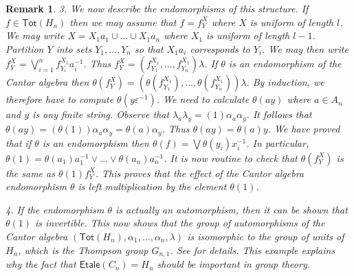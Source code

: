 \documentclass[a4paper]{amsart}
\newtheorem{remark}[theorem]{Remark}
\begin{document}
\begin{remark}
{3. {\em We now describe the endomorphisms of this structure.}
If $f \in \mathsf{Tot}(H_{n})$ then we may assume that $f = f^{X}_{Y}$
where $X$ is uniform of length $l$.
We may write
$X = X_{1}a_{1} \cup \ldots \cup X_{1}a_{n}$
where $X_{1}$ is uniform of length $l-1$.
Partition $Y$ into sets $Y_{1},\ldots, Y_{n}$
so that $X_{1}a_{i}$ corresponds to $Y_{i}$.
We may then write $f^{X}_{Y} = \bigvee_{i=1}^{n} f^{X_{1}}_{Y_{i}}a_{i}^{-1}$.
Thus $f^{X}_{Y} = (f^{X_{1}}_{Y_{1}}, \ldots, f^{X_{1}}_{Y_{n}})\lambda$.
If $\theta$ is an endomorphism of the Cantor algebra then
$\theta (f^{X}_{Y}) = (\theta (f^{X_{1}}_{Y_{1}}), \ldots, \theta (f^{X_{1}}_{Y_{n}}))\lambda$.
By induction, we therefore have to compute $\theta (y\varepsilon^{-1})$.
We need to calculate $\theta (ay)$ where $a \in A_{n}$ and $y$ is any finite string.
Observe that $\lambda_{a} \lambda_{y} = (1)\alpha_{a} \alpha_{y}$.
It follows that $\theta (ay) = (\theta (1))\alpha_{a}\alpha_{y} = \theta (a)\alpha_{y}$.
Thus $\theta (ay) = \theta (a)y$.
We have proved that if  $\theta$ is an endomorphism then $\theta (f) = \bigvee \theta (y_{i})x_{i}^{-1}$.
In particular, $\theta (1) = \theta (a_{1})a_{1}^{-1} \vee \ldots \vee \theta (a_{n})a_{n}^{-1}$.
It is now routine to check that $\theta (f^{X}_{Y})$ is the same as $\theta (1)f^{X}_{Y}$.
This proves that the effect of the Cantor algebra endomorphism  $\theta$ is left multiplication by the element $\theta (1)$.

4. {\em If the endomorphism $\theta$ is actually an automorphism, then it can be shown that $\theta (1)$ is invertible.}
This now shows that the group of automorphisms of the Cantor algebra $(\mathsf{Tot}(H_{n}), \alpha_{1}, \ldots, \alpha_{n}, \lambda)$
is isomorphic to the group of units of $H_{n}$, which is the Thompson group $G_{n,1}$.
See \cite{Lawson2021b} for details.
This example explains why the fact that $\mathsf{Etale}(C_{n}) = H_{n}$
should be important in group theory.}
\end{remark}
\end{document}
